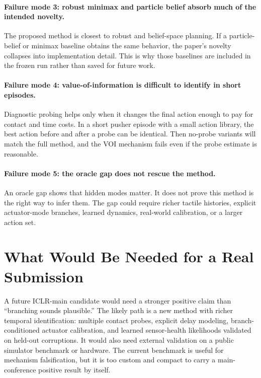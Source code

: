 \documentclass{article}
\begin{document}
\paragraph{Failure mode 3: robust minimax and particle belief absorb much of the intended novelty.}
The proposed method is closest to robust and belief-space planning. If a particle-belief or minimax baseline obtains the same behavior, the paper's novelty collapses into implementation detail. This is why those baselines are included in the frozen run rather than saved for future work.

\paragraph{Failure mode 4: value-of-information is difficult to identify in short episodes.}
Diagnostic probing helps only when it changes the final action enough to pay for contact and time costs. In a short pusher episode with a small action library, the best action before and after a probe can be identical. Then no-probe variants will match the full method, and the VOI mechanism fails even if the probe estimate is reasonable.

\paragraph{Failure mode 5: the oracle gap does not rescue the method.}
An oracle gap shows that hidden modes matter. It does not prove this method is the right way to infer them. The gap could require richer tactile histories, explicit actuator-mode branches, learned dynamics, real-world calibration, or a larger action set.

\section{What Would Be Needed for a Real Submission}

A future ICLR-main candidate would need a stronger positive claim than ``branching sounds plausible.'' The likely path is a new method with richer temporal identification: multiple contact probes, explicit delay modeling, branch-conditioned actuator calibration, and learned sensor-health likelihoods validated on held-out corruptions. It would also need external validation on a public simulator benchmark or hardware. The current benchmark is useful for mechanism falsification, but it is too custom and compact to carry a main-conference positive result by itself.
\end{document}
